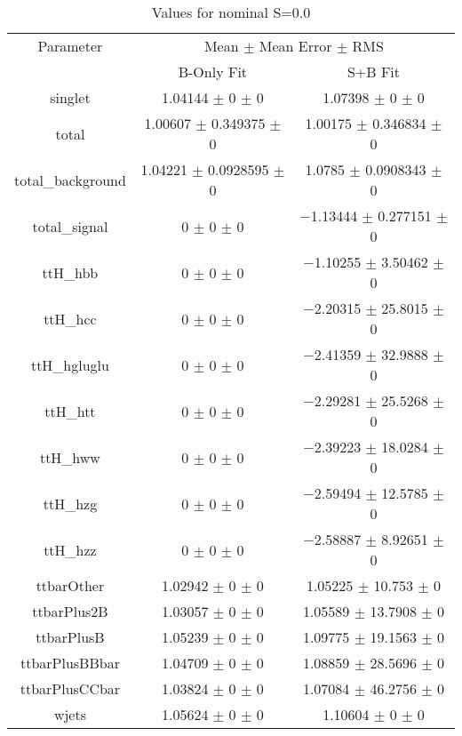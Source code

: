 \begin{table}
\centering
\caption{Values for nominal S=0.0}
\begin{tabular}{ccc}
\toprule
Parameter & \multicolumn{2}{c}{Mean $\pm$ Mean Error $\pm$ RMS}\\
 & B-Only Fit & S+B Fit\\
\midrule
singlet & \num{1.04144} $\pm$ \num{0} $\pm$ \num{0} & \num{1.07398} $\pm$ \num{0} $\pm$ \num{0}\\
total & \num{1.00607} $\pm$ \num{0.349375} $\pm$ \num{0} & \num{1.00175} $\pm$ \num{0.346834} $\pm$ \num{0}\\
total\_background & \num{1.04221} $\pm$ \num{0.0928595} $\pm$ \num{0} & \num{1.0785} $\pm$ \num{0.0908343} $\pm$ \num{0}\\
total\_signal & \num{0} $\pm$ \num{0} $\pm$ \num{0} & \num{-1.13444} $\pm$ \num{0.277151} $\pm$ \num{0}\\
ttH\_hbb & \num{0} $\pm$ \num{0} $\pm$ \num{0} & \num{-1.10255} $\pm$ \num{3.50462} $\pm$ \num{0}\\
ttH\_hcc & \num{0} $\pm$ \num{0} $\pm$ \num{0} & \num{-2.20315} $\pm$ \num{25.8015} $\pm$ \num{0}\\
ttH\_hgluglu & \num{0} $\pm$ \num{0} $\pm$ \num{0} & \num{-2.41359} $\pm$ \num{32.9888} $\pm$ \num{0}\\
ttH\_htt & \num{0} $\pm$ \num{0} $\pm$ \num{0} & \num{-2.29281} $\pm$ \num{25.5268} $\pm$ \num{0}\\
ttH\_hww & \num{0} $\pm$ \num{0} $\pm$ \num{0} & \num{-2.39223} $\pm$ \num{18.0284} $\pm$ \num{0}\\
ttH\_hzg & \num{0} $\pm$ \num{0} $\pm$ \num{0} & \num{-2.59494} $\pm$ \num{12.5785} $\pm$ \num{0}\\
ttH\_hzz & \num{0} $\pm$ \num{0} $\pm$ \num{0} & \num{-2.58887} $\pm$ \num{8.92651} $\pm$ \num{0}\\
ttbarOther & \num{1.02942} $\pm$ \num{0} $\pm$ \num{0} & \num{1.05225} $\pm$ \num{10.753} $\pm$ \num{0}\\
ttbarPlus2B & \num{1.03057} $\pm$ \num{0} $\pm$ \num{0} & \num{1.05589} $\pm$ \num{13.7908} $\pm$ \num{0}\\
ttbarPlusB & \num{1.05239} $\pm$ \num{0} $\pm$ \num{0} & \num{1.09775} $\pm$ \num{19.1563} $\pm$ \num{0}\\
ttbarPlusBBbar & \num{1.04709} $\pm$ \num{0} $\pm$ \num{0} & \num{1.08859} $\pm$ \num{28.5696} $\pm$ \num{0}\\
ttbarPlusCCbar & \num{1.03824} $\pm$ \num{0} $\pm$ \num{0} & \num{1.07084} $\pm$ \num{46.2756} $\pm$ \num{0}\\
wjets & \num{1.05624} $\pm$ \num{0} $\pm$ \num{0} & \num{1.10604} $\pm$ \num{0} $\pm$ \num{0}\\
\bottomrule
\end{tabular}
\end{table}